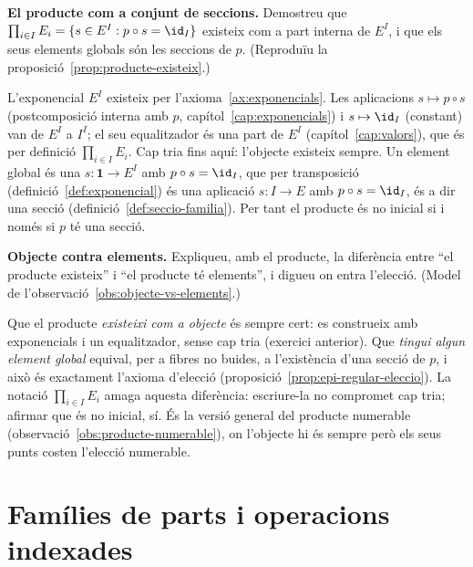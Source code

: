 \begin{exercici}
\textbf{El producte com a conjunt de seccions.} Demostreu que \(\prod_{i\in I}E_i=\{s\in E^I : p\circ s=\id_I\}\) existeix com a part interna de \(E^I\), i que els seus elements globals són les seccions de \(p\). (Reproduïu la proposició~\ref{prop:producte-existeix}.)
\end{exercici}
\begin{solucio}
L'exponencial \(E^I\) existeix per l'axioma~\ref{ax:exponencials}. Les aplicacions \(s\mapsto p\circ s\) (postcomposició interna amb \(p\), capítol~\ref{cap:exponencials}) i \(s\mapsto\id_I\) (constant) van de \(E^I\) a \(I^I\); el seu equalitzador és una part de \(E^I\) (capítol~\ref{cap:valors}), que és per definició \(\prod_{i\in I}E_i\). Cap tria fins aquí: l'objecte existeix sempre. Un element global és una \(s\colon\mathbf1\to E^I\) amb \(p\circ s=\id_I\), que per transposició (definició~\ref{def:exponencial}) és una aplicació \(s\colon I\to E\) amb \(p\circ s=\id_I\), és a dir una secció (definició~\ref{def:seccio-familia}). Per tant el producte és no inicial si i només si \(p\) té una secció.
\end{solucio}

\begin{exercici}
\textbf{Objecte contra elements.} Expliqueu, amb el producte, la diferència entre \enquote{el producte existeix} i \enquote{el producte té elements}, i digueu on entra l'elecció. (Model de l'observació~\ref{obs:objecte-vs-elements}.)
\end{exercici}
\begin{solucio}
Que el producte \emph{existeixi com a objecte} és sempre cert: es construeix amb exponencials i un equalitzador, sense cap tria (exercici anterior). Que \emph{tingui algun element global} equival, per a fibres no buides, a l'existència d'una secció de \(p\), i això és exactament l'axioma d'elecció (proposició~\ref{prop:epi-regular-eleccio}). La notació \(\prod_{i\in I}E_i\) amaga aquesta diferència: escriure-la no compromet cap tria; afirmar que és no inicial, sí. És la versió general del producte numerable (observació~\ref{obs:producte-numerable}), on l'objecte hi és sempre però els seus punts costen l'elecció numerable.
\end{solucio}

\section{Famílies de parts i operacions indexades}\label{prac:parts-indexades}

